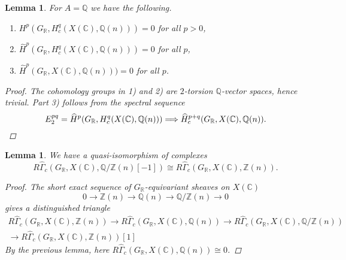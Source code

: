 \documentclass[draft,leqno,12pt]{article}
\theoremstyle{plain}
\newtheorem{lemma}[theorem]{\indent\sc Lemma}
\theoremstyle{definition}
\newcommand{\ZZ}{\mathbb{Z}}
\newcommand{\QQ}{\mathbb{Q}}
\newcommand{\RR}{\mathbb{R}}
\newcommand{\CC}{\mathbb{C}}
\begin{document}
\begin{lemma}
  For $A = \QQ$ we have the following.

  \begin{enumerate}
  \item[$1)$] $H^p (G_\RR, H_c^q (X (\CC), \QQ (n))) = 0$ for all $p > 0$,

  \item[$2)$] $\widehat{H}^p (G_\RR, H_c^q (X (\CC), \QQ (n))) = 0$ for all $p$,

  \item[$3)$] $\widehat{H}^p (G_\RR, X (\CC), \QQ (n))) = 0$ for all $p$.
  \end{enumerate}

  \begin{proof}
    The cohomology groups in 1) and 2) are $2$-torsion $\QQ$-vector spaces,
    hence trivial. Part 3) follows from the spectral sequence
    \[ E_2^{pq} = \widehat{H}^p (G_\RR, H^q_c (X (\CC), \QQ (n)))
    \Longrightarrow
    \widehat{H}^{p+q}_c (G_\RR, X (\CC), \QQ (n)). \qedhere \]
  \end{proof}
\end{lemma}

\begin{lemma}
  We have a quasi-isomorphism of complexes
  \[ R\widehat{\Gamma}_c (G_\RR, X (\CC), \QQ/\ZZ (n) [-1]) \cong
  R\widehat{\Gamma}_c (G_\RR, X (\CC), \ZZ (n)).\]

  \begin{proof}
    The short exact sequence of $G_\RR$-equivariant sheaves on $X (\CC)$
    $$0 \to \ZZ (n) \to \QQ (n) \to \QQ/\ZZ (n) \to 0$$
    gives a distinguished triangle
    \begin{multline*}
      R\widehat{\Gamma}_c (G_\RR, X (\CC), \ZZ (n)) \to
      R\widehat{\Gamma}_c (G_\RR, X (\CC), \QQ (n)) \to
      R\widehat{\Gamma}_c (G_\RR, X (\CC), \QQ/\ZZ (n)) \\
      \to R\widehat{\Gamma}_c (G_\RR, X (\CC), \ZZ (n)) [1]
    \end{multline*}
    By the previous lemma, here
    $R\widehat{\Gamma}_c (G_\RR, X (\CC), \QQ (n)) \cong 0$.
  \end{proof}
\end{lemma}
\end{document}

